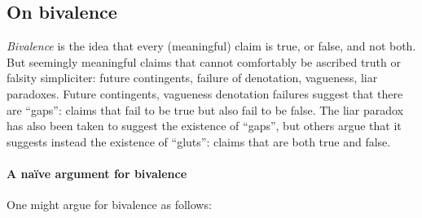 \documentclass[../../../include/open-logic-section]{subfiles}
\begin{document}


\subsection{On bivalence}

\emph{Bivalence} is the idea that every (meaningful) claim is true, or false, and
not both. But seemingly meaningful claims that cannot comfortably be ascribed
truth or falsity simpliciter: future contingents, failure of denotation,
vagueness, liar paradoxes. Future contingents, vagueness denotation failures
suggest that there are ``gaps'': claims that fail to be true but also fail to
be false. The liar paradox has also been taken to suggest the existence of
``gaps'', but others argue that it suggests instead the existence of
``gluts'': claims that are both true and false. 





\paragraph{A naïve argument for bivalence} One might argue for bivalence as follows:
\end{document}
